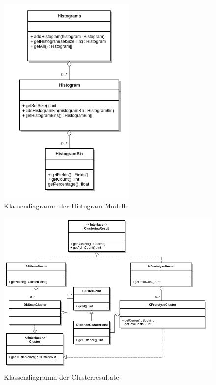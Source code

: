 \begin{figure}[H]
	\centering
	\includegraphics[width=0.6\textwidth]{images/diagram-class-Histograms}
	\caption{Klassendiagramm der Histogram-Modelle}
	\label{fig:proofofconcept:klassenstruktur:6}
\end{figure}
\begin{figure}
	\centering
	\includegraphics[width=1\textwidth]{images/diagram-class-clusters}
	\caption{Klassendiagramm der Clusterresultate}
	\label{fig:proofofconcept:klassenstruktur:7}
\end{figure}
